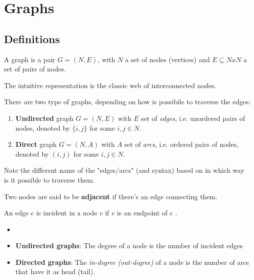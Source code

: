 \chapter{Graphs}
    \section{Definitions}
        \begin{definition}[Graph]
            A graph is a pair $G = (N, E)$, with $N$ a set of nodes (vertices) and $E \subseteq N x N$ a set of pairs of nodes.
        \end{definition}
        The intuitive representation is the classic web of interconnected nodes.

        There are two type of graphs, depending on how is possibile to traverse the edges:
        \begin{enumerate}
            \item \textbf{Undirected} graph $G = (N, E)$ with $E$ set of \textit{edges}, i.e. unordered pairs of nodes, denoted by $\{i, j\}$ for some $i, j \in N$.
            \item \textbf{Direct} graph $G = (N, A)$ with $A$ set of \textit{arcs}, i.e. ordered pairs of nodes, denoted by $(i, j)$ for some $i, j \in N$.
        \end{enumerate}
        Note the different name of the "edges/arcs" (and syntax) based on in which way is it possible to traverse them.
        \begin{definition}
            Two nodes are said to be \textbf{adjacent} if there's an edge connecting them.
        \end{definition}
        \begin{definition}
            An edge $e$ is incident in a node $v$ if $v$ is an endpoint of $e$ .
        \end{definition}
        \begin{definition}
            \begin{itemize}
                \item[]
                \item[] \textbf{Undirected graphs}: The degree of a node is the number of incident edges
                \item[] \textbf{Directed graphs}: The \textit{in-degree (out-degree)} of a node is the number of arcs that have it as head (tail).
            \end{itemize}
        \end{definition}
